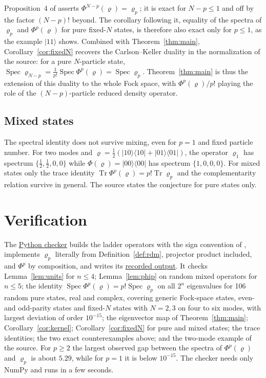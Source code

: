 \documentclass[11pt,a4paper]{article}
\theoremstyle{definition}
\theoremstyle{plain}
\DeclareMathOperator{\Tr}{Tr}
\DeclareMathOperator{\Spec}{Spec}
\newcommand{\ket}[1]{\lvert#1\rangle}
\newcommand{\bra}[1]{\langle#1\rvert}
\begin{document}
Proposition~4 of \cite{AmosovFilippov2017} asserts
$\Phi^{N-p}(\varrho)=\varrho_p$; it is exact for $N-p\le1$ and off by the
factor $(N-p)!$ beyond. The corollary following it, equality of the spectra
of $\varrho_p$ and $\Phi^p(\varrho)$ for pure fixed-$N$ states, is therefore
also exact only for $p\le1$, as the example $\ket{11}$ shows. Combined with
Theorem~\ref{thm:main}, Corollary~\ref{cor:fixedN} recovers the
Carlson--Keller duality in the normalization of the source: for a pure
$N$-particle state,
$\Spec\varrho_{N-p}=\frac1{p!}\Spec\Phi^p(\varrho)=\Spec\varrho_p$.
Theorem~\ref{thm:main} is thus the extension of this duality to the whole
Fock space, with $\Phi^p(\varrho)/p!$ playing the role of the
$(N-p)$-particle reduced density operator.

\subsection{Mixed states}
The spectral identity does not survive mixing, even for $p=1$ and fixed
particle number. For two modes and
$\varrho=\frac12(\ket{10}\bra{10}+\ket{01}\bra{01})$, the operator
$\varrho_1$ has spectrum $\{\frac12,\frac12,0,0\}$ while
$\Phi(\varrho)=\ket{00}\bra{00}$ has spectrum $\{1,0,0,0\}$. For mixed states
only the trace identity $\Tr\Phi^p(\varrho)=p!\Tr\varrho_p$ and the
complementarity relation survive in general. The source states the
conjecture for pure states only.

\section{Verification}\label{sec:verification}
The
\href{https://github.com/jpbruneton/open_quantum_problems/blob/main/research/entries/fermionic-particle-reductions/checks/verify_particle_reductions.py}{Python checker}
builds the ladder operators with the sign convention of
\cite{AmosovFilippov2017}, implements $\varrho_p$ literally from
Definition~\ref{def:rdm}, projector product included, and $\Phi^p$ by
composition, and writes its
\href{https://github.com/jpbruneton/open_quantum_problems/blob/main/research/entries/fermionic-particle-reductions/data/verification.json}{recorded output}.
It checks Lemma~\ref{lem:units} for $n\le4$; Lemma~\ref{lem:phip} on random
mixed operators for $n\le5$; the identity $\Spec\Phi^p(\varrho)=p!\Spec\varrho_p$
on all $2^n$ eigenvalues for 106 random pure states, real and complex,
covering generic Fock-space states, even- and odd-parity states and
fixed-$N$ states with $N=2,3$ on four to six modes, with largest deviation of
order $10^{-15}$; the eigenvector map of Theorem~\ref{thm:main};
Corollary~\ref{cor:kernel}; Corollary~\ref{cor:fixedN} for pure and mixed
states; the trace identities; the two exact counterexamples above; and the
two-mode example of the source. For $p\ge2$ the largest observed gap between
the spectra of $\Phi^p(\varrho)$ and $\varrho_p$ is about $5.29$, while for
$p=1$ it is below $10^{-15}$. The checker needs only NumPy and runs in a few
seconds.
\end{document}
